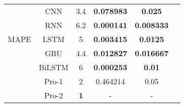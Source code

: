 \begin{table}[htbp]
{\begin{tabular}{cccccc}
        \midrule
        \multirow{5}{*}{MAPE} & CNN & 3.4 & \textbf{0.078983} & \textbf{0.025} \\
        & RNN & 6.2 & \textbf{0.000141} & \textbf{0.008333} \\
        & LSTM & 5 & \textbf{0.003415} & \textbf{0.0125} \\
        & GRU & 4.4 & \textbf{0.012827} & \textbf{0.016667} \\
        & BiLSTM & 6 & \textbf{0.000253} & \textbf{0.01} \\
        & Pro-1 & 2 & 0.464214 & 0.05 \\
        & Pro-2 & \textbf{1}  & - & -\\
        \bottomrule
    \end{tabular}}
    
    \label{tab:error_metrics}
\end{table}
